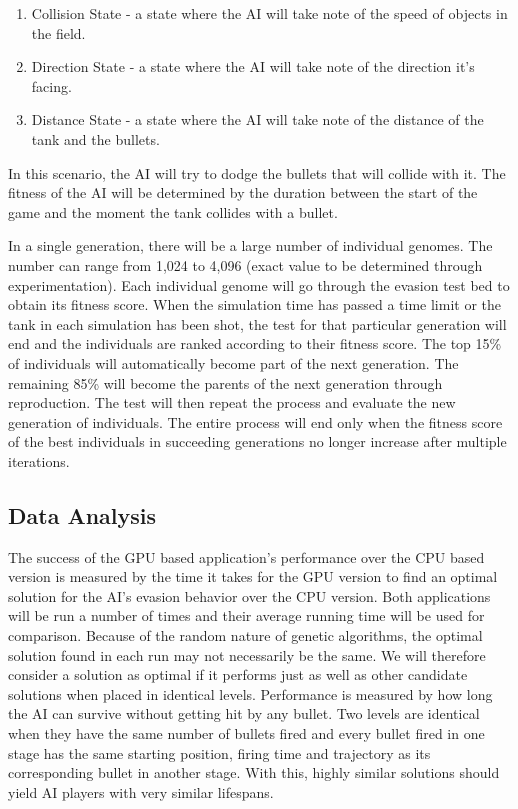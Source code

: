 \begin{enumerate}
 \item Collision State - a state where the AI will take note of the speed 
of objects in the field.
 \item Direction State - a state where the AI will take note 
of the direction it's facing.
 \item Distance State - a state where the AI will
take note of the distance of the tank and the bullets.
\end{enumerate}

In this scenario, the AI will try to dodge the bullets that will collide with
it. The fitness of the AI will be determined by the duration between the start of
the game and the moment the tank collides with a bullet.


In a single generation, there will be a large number of individual genomes. The number
can range from 1,024 to 4,096 (exact value to be determined through experimentation).
Each individual genome will go through the evasion test bed to obtain its fitness score.
When the simulation time has passed a time limit or the tank in each simulation has been
shot, the test for that particular generation will end and the individuals are ranked
according to their fitness score. The top 15\% of individuals will automatically become
part of the next generation. The remaining 85\% will become the parents of the next generation 
through reproduction. The test will then repeat the process and evaluate the new
generation of individuals. The entire process will end only when the fitness score
of the best individuals in succeeding generations no longer increase after multiple iterations.


\subsection{Data Analysis}
The success of the GPU based application's performance over the CPU based version is measured
by the time it takes for the GPU version to find an optimal solution for the AI's evasion
behavior over the CPU version. Both applications will be run a number of times and their
average running time will be used for comparison. Because of the random nature of genetic
algorithms, the optimal solution found in each run may not necessarily be the same. We will
therefore consider a solution as optimal if it performs just as well as other candidate
solutions when placed in identical levels. Performance is measured by how long the AI
can survive without getting hit by any bullet. Two levels are identical when they have the
same number of bullets fired and every bullet fired in one stage has the same starting position,
firing time and trajectory as its corresponding bullet in another stage. With this, highly
similar solutions should yield AI players with very similar lifespans.